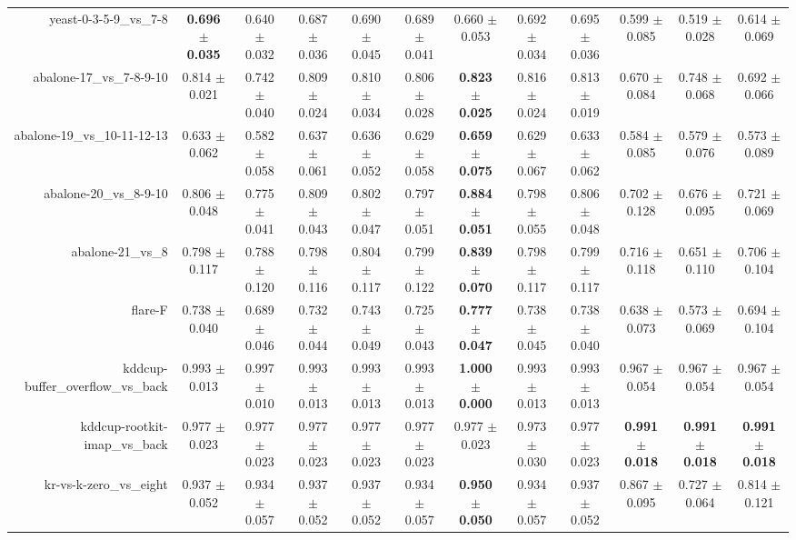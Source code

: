 \begin{table}[!ht]
{\begin{tabular}{r c c c c c c c c c c c}
yeast-0-3-5-9\_vs\_7-8 & \textbf{0.696 $\pm$ 0.035} & 0.640 $\pm$ 0.032 & 0.687 $\pm$ 0.036 & 0.690 $\pm$ 0.045 & 0.689 $\pm$ 0.041 & 0.660 $\pm$ 0.053 & 0.692 $\pm$ 0.034 & 0.695 $\pm$ 0.036 & 0.599 $\pm$ 0.085 & 0.519 $\pm$ 0.028 & 0.614 $\pm$ 0.069 \\
abalone-17\_vs\_7-8-9-10 & 0.814 $\pm$ 0.021 & 0.742 $\pm$ 0.040 & 0.809 $\pm$ 0.024 & 0.810 $\pm$ 0.034 & 0.806 $\pm$ 0.028 & \textbf{0.823 $\pm$ 0.025} & 0.816 $\pm$ 0.024 & 0.813 $\pm$ 0.019 & 0.670 $\pm$ 0.084 & 0.748 $\pm$ 0.068 & 0.692 $\pm$ 0.066 \\
abalone-19\_vs\_10-11-12-13 & 0.633 $\pm$ 0.062 & 0.582 $\pm$ 0.058 & 0.637 $\pm$ 0.061 & 0.636 $\pm$ 0.052 & 0.629 $\pm$ 0.058 & \textbf{0.659 $\pm$ 0.075} & 0.629 $\pm$ 0.067 & 0.633 $\pm$ 0.062 & 0.584 $\pm$ 0.085 & 0.579 $\pm$ 0.076 & 0.573 $\pm$ 0.089 \\
abalone-20\_vs\_8-9-10 & 0.806 $\pm$ 0.048 & 0.775 $\pm$ 0.041 & 0.809 $\pm$ 0.043 & 0.802 $\pm$ 0.047 & 0.797 $\pm$ 0.051 & \textbf{0.884 $\pm$ 0.051} & 0.798 $\pm$ 0.055 & 0.806 $\pm$ 0.048 & 0.702 $\pm$ 0.128 & 0.676 $\pm$ 0.095 & 0.721 $\pm$ 0.069 \\
abalone-21\_vs\_8 & 0.798 $\pm$ 0.117 & 0.788 $\pm$ 0.120 & 0.798 $\pm$ 0.116 & 0.804 $\pm$ 0.117 & 0.799 $\pm$ 0.122 & \textbf{0.839 $\pm$ 0.070} & 0.798 $\pm$ 0.117 & 0.799 $\pm$ 0.117 & 0.716 $\pm$ 0.118 & 0.651 $\pm$ 0.110 & 0.706 $\pm$ 0.104 \\
flare-F & 0.738 $\pm$ 0.040 & 0.689 $\pm$ 0.046 & 0.732 $\pm$ 0.044 & 0.743 $\pm$ 0.049 & 0.725 $\pm$ 0.043 & \textbf{0.777 $\pm$ 0.047} & 0.738 $\pm$ 0.045 & 0.738 $\pm$ 0.040 & 0.638 $\pm$ 0.073 & 0.573 $\pm$ 0.069 & 0.694 $\pm$ 0.104 \\
kddcup-buffer\_overflow\_vs\_back & 0.993 $\pm$ 0.013 & 0.997 $\pm$ 0.010 & 0.993 $\pm$ 0.013 & 0.993 $\pm$ 0.013 & 0.993 $\pm$ 0.013 & \textbf{1.000 $\pm$ 0.000} & 0.993 $\pm$ 0.013 & 0.993 $\pm$ 0.013 & 0.967 $\pm$ 0.054 & 0.967 $\pm$ 0.054 & 0.967 $\pm$ 0.054 \\
kddcup-rootkit-imap\_vs\_back & 0.977 $\pm$ 0.023 & 0.977 $\pm$ 0.023 & 0.977 $\pm$ 0.023 & 0.977 $\pm$ 0.023 & 0.977 $\pm$ 0.023 & 0.977 $\pm$ 0.023 & 0.973 $\pm$ 0.030 & 0.977 $\pm$ 0.023 & \textbf{0.991 $\pm$ 0.018} & \textbf{0.991 $\pm$ 0.018} & \textbf{0.991 $\pm$ 0.018} \\
kr-vs-k-zero\_vs\_eight & 0.937 $\pm$ 0.052 & 0.934 $\pm$ 0.057 & 0.937 $\pm$ 0.052 & 0.937 $\pm$ 0.052 & 0.934 $\pm$ 0.057 & \textbf{0.950 $\pm$ 0.050} & 0.934 $\pm$ 0.057 & 0.937 $\pm$ 0.052 & 0.867 $\pm$ 0.095 & 0.727 $\pm$ 0.064 & 0.814 $\pm$ 0.121 \\

\end{tabular}}
\end{table}
